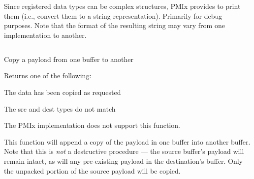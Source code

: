 \descr

Since registered data types can be complex structures, \ac{PMIx} provides  to print them (i.e., convert them to a string representation). Primarily for debug purposes.  Note that the format of the resulting string may vary from one implementation to another.


\subsection{}

\summary

Copy a payload from one buffer to another

\format


\begin{arglist}
\end{arglist}

Returns one of the following:
\begin{constantdesc}
\item {} The data has been copied as requested
\item {} The src and dest  types do not match
\item {} The \ac{PMIx} implementation does not support this function.
\end{constantdesc}

\descr

This function will append a copy of the payload in one buffer into another buffer. Note that this is \textit{not} a destructive procedure --- the source buffer's payload will remain intact, as will any pre-existing payload in the destination's buffer. Only the unpacked portion of the source payload will be copied.

\subsection{}

